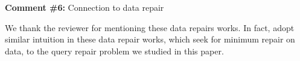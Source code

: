 \comskip

\noindent
\textbf{Comment \#6:} Connection to data repair
\begin{quote}
\end{quote}

We thank the reviewer for mentioning these data repairs works. In fact, 
\sys adopt similar intuition in these data repair works, 
which seek for minimum repair on data, 
to the query repair problem we studied in this paper. 

 
